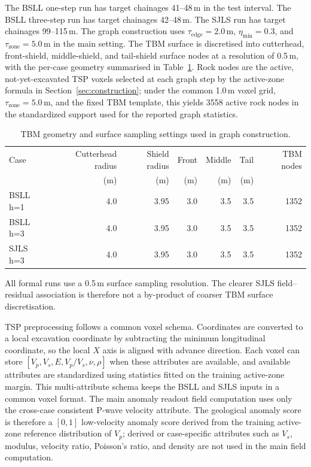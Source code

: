 The BSLL one-step run has target chainages 41--48\,m in the test interval. The
BSLL three-step run has target chainages 42--48\,m. The SJLS run has target
chainages 99--115\,m. The graph construction uses
$\tau_{\mathrm{edge}}=2.0$\,m, $\eta_{\min}=0.3$, and
$\tau_{\mathrm{zone}}=5.0$\,m in the main setting. The TBM surface is
discretised into cutterhead, front-shield, middle-shield, and tail-shield
surface nodes at a resolution of 0.5\,m, with the per-case geometry
summarised in Table~\ref{tab:tbm_geometry_sampling}.
Rock nodes are the active, not-yet-excavated TSP voxels selected at each graph
step by the active-zone formula in Section~\ref{sec:construction}; under
the common 1.0\,m voxel grid, $\tau_{\mathrm{zone}}=5.0$\,m, and the fixed TBM
template, this yields 3558 active rock nodes in the standardized support used
for the reported graph statistics.

\begin{table}[htbp]
\centering
\caption{TBM geometry and surface sampling settings used in graph construction.}
\label{tab:tbm_geometry_sampling}
\scriptsize
\setlength{\tabcolsep}{4pt}
\begin{tabular}{lrrrrrr}
\toprule
Case & Cutterhead radius & Shield radius & Front & Middle & Tail & TBM nodes \\
 & (m) & (m) & (m) & (m) & (m) & \\
\midrule
BSLL h=1 & 4.0 & 3.95 & 3.0 & 3.5 & 3.5 & 1352 \\
BSLL h=3 & 4.0 & 3.95 & 3.0 & 3.5 & 3.5 & 1352 \\
SJLS h=3 & 4.0 & 3.95 & 3.0 & 3.5 & 3.5 & 1352 \\
\bottomrule
\end{tabular}
\end{table}

All formal runs use a 0.5\,m surface sampling resolution. The clearer SJLS
field--residual association is therefore not a by-product of coarser TBM
surface discretisation.

TSP preprocessing follows a common voxel schema. Coordinates are converted to a
local excavation coordinate by subtracting the minimum longitudinal coordinate,
so the local $X$ axis is aligned with advance direction. Each voxel can store
$[V_p,V_s,E,V_p/V_s,\nu,\rho]$ when these attributes are available, and
available attributes are standardized using statistics fitted on the training
active-zone margin. This multi-attribute schema keeps the BSLL and SJLS inputs
in a common voxel format. The main anomaly readout field computation uses
only the cross-case consistent P-wave velocity attribute. The geological
anomaly score is therefore a $[0,1]$ low-velocity anomaly score derived from
the training active-zone reference distribution of $V_p$; derived or
case-specific attributes such as $V_s$, modulus, velocity ratio, Poisson's
ratio, and density are not used in the main field computation.

